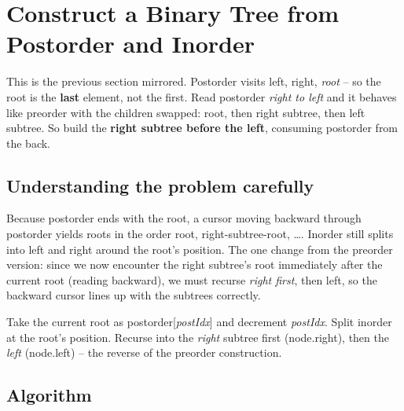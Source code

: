\section{Construct a Binary Tree from Postorder and Inorder}
\label{sec:trees-construct-post-in}


\begin{patternbox}
This is the previous section mirrored. Postorder visits left, right,
\emph{root} -- so the root is the \textbf{last} element, not the first. Read
postorder \emph{right to left} and it behaves like preorder with the
children swapped: root, then right subtree, then left subtree. So build the
\textbf{right subtree before the left}, consuming postorder from the back.
\end{patternbox}

\subsection*{Understanding the problem carefully}

Because postorder ends with the root, a cursor moving backward through
postorder yields roots in the order root, right-subtree-root,
\ldots. Inorder still splits into left and right around the root's
position. The one change from the preorder version: since we now encounter
the right subtree's root immediately after the current root (reading
backward), we must recurse \emph{right first}, then left, so the backward
cursor lines up with the subtrees correctly.

\begin{ideabox}
Take the current root as postorder[\textit{postIdx}] and decrement
\textit{postIdx}. Split inorder at the root's position. Recurse into the
\emph{right} subtree first (node.right), then the \emph{left}
(node.left) -- the reverse of the preorder construction.
\end{ideabox}

\subsection*{Algorithm}

